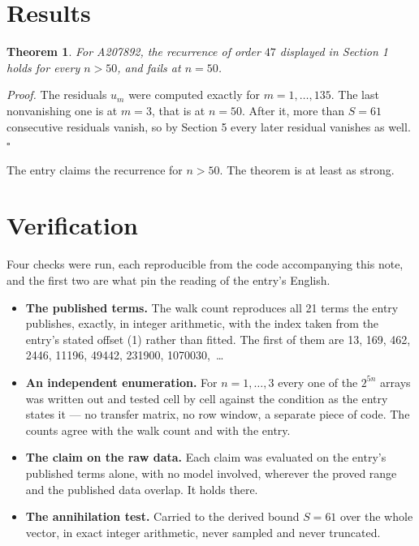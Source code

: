 \documentclass[11pt]{article}
\newtheorem{theorem}{Theorem}
\theoremstyle{definition}
\begin{document}
\section{Results}

\begin{theorem} For A207892, the recurrence of order $47$ displayed in Section 1 holds for every $n > 50$, and fails at $n = 50$.\end{theorem}

{\itshape Proof.} The residuals $u_m$ were computed exactly for $m = 1,\dots,135$. The last nonvanishing one is at $m = 3$, that is at $n = 50$. After it, more than $S = 61$ consecutive residuals vanish, so by Section 5 every later residual vanishes as well. $\square$

The entry claims the recurrence for $n > 50$. The theorem is at least as strong.

\section{Verification}

Four checks were run, each reproducible from the code accompanying this note, and the first two are what pin the reading of the entry's English.

\begin{itemize}

\item {\bfseries The published terms.} The walk count reproduces all 21 terms the entry publishes, exactly, in integer arithmetic, with the index taken from the entry's stated offset (1) rather than fitted. The first of them are 13, 169, 462, 2446, 11196, 49442, 231900, 1070030,~\dots

\item {\bfseries An independent enumeration.} For $n = 1,\dots,3$ every one of the $2^{5n}$ arrays was written out and tested cell by cell against the condition as the entry states it --- no transfer matrix, no row window, a separate piece of code. The counts agree with the walk count and with the entry.

\item {\bfseries The claim on the raw data.} Each claim was evaluated on the entry's published terms alone, with no model involved, wherever the proved range and the published data overlap. It holds there.

\item {\bfseries The annihilation test.} Carried to the derived bound $S = 61$ over the whole vector, in exact integer arithmetic, never sampled and never truncated.

\end{itemize}
\end{document}
